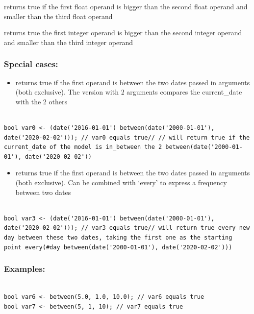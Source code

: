 \documentclass[]{book}
\providecommand{\tightlist}{%
  \setlength{\itemsep}{0pt}\setlength{\parskip}{0pt}}
\theoremstyle{definition}
\theoremstyle{definition}
\theoremstyle{definition}
\theoremstyle{remark}
\begin{document}
returns true if the first float operand is bigger than the second float
operand and smaller than the third float operand

returns true the first integer operand is bigger than the second integer
operand and smaller than the third integer operand

\subsubsection{Special cases:}\label{special-cases-24}

\begin{itemize}
\tightlist
\item
  returns true if the first operand is between the two dates passed in
  arguments (both exclusive). The version with 2 arguments compares the
  current\_date with the 2 others
\end{itemize}

\begin{verbatim}
 
bool var0 <- (date('2016-01-01') between(date('2000-01-01'), date('2020-02-02'))); // var0 equals true// // will return true if the current_date of the model is in_between the 2 between(date('2000-01-01'), date('2020-02-02')) 
\end{verbatim}

\begin{itemize}
\tightlist
\item
  returns true if the first operand is between the two dates passed in
  arguments (both exclusive). Can be combined with `every' to express a
  frequency between two dates
\end{itemize}

\begin{verbatim}
 
bool var3 <- (date('2016-01-01') between(date('2000-01-01'), date('2020-02-02'))); // var3 equals true// will return true every new day between these two dates, taking the first one as the starting point every(#day between(date('2000-01-01'), date('2020-02-02')))  
\end{verbatim}

\subsubsection{Examples:}\label{examples-53}

\begin{verbatim}
 
bool var6 <- between(5.0, 1.0, 10.0); // var6 equals true 
bool var7 <- between(5, 1, 10); // var7 equals true
\end{verbatim}
\end{document}
